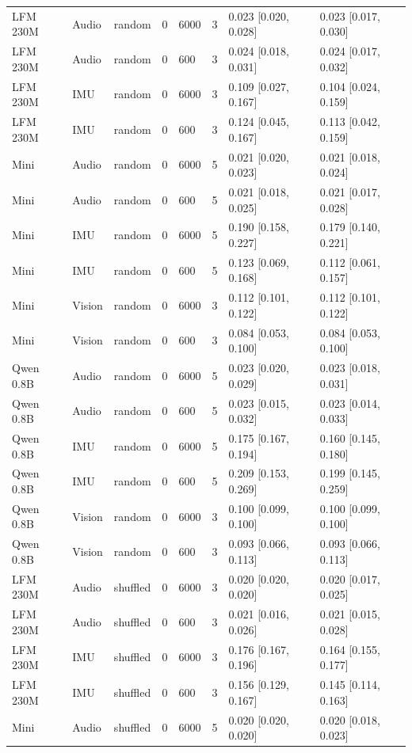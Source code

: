{\begin{longtable}{@{}llllllll@{}}
LFM 230M & Audio & random & 0 & 6000 & 3 & 0.023 [0.020, 0.028] & 0.023 [0.017, 0.030] \\
LFM 230M & Audio & random & 0 & 600 & 3 & 0.024 [0.018, 0.031] & 0.024 [0.017, 0.032] \\
LFM 230M & IMU & random & 0 & 6000 & 3 & 0.109 [0.027, 0.167] & 0.104 [0.024, 0.159] \\
LFM 230M & IMU & random & 0 & 600 & 3 & 0.124 [0.045, 0.167] & 0.113 [0.042, 0.159] \\
Mini & Audio & random & 0 & 6000 & 5 & 0.021 [0.020, 0.023] & 0.021 [0.018, 0.024] \\
Mini & Audio & random & 0 & 600 & 5 & 0.021 [0.018, 0.025] & 0.021 [0.017, 0.028] \\
Mini & IMU & random & 0 & 6000 & 5 & 0.190 [0.158, 0.227] & 0.179 [0.140, 0.221] \\
Mini & IMU & random & 0 & 600 & 5 & 0.123 [0.069, 0.168] & 0.112 [0.061, 0.157] \\
Mini & Vision & random & 0 & 6000 & 3 & 0.112 [0.101, 0.122] & 0.112 [0.101, 0.122] \\
Mini & Vision & random & 0 & 600 & 3 & 0.084 [0.053, 0.100] & 0.084 [0.053, 0.100] \\
Qwen 0.8B & Audio & random & 0 & 6000 & 5 & 0.023 [0.020, 0.029] & 0.023 [0.018, 0.031] \\
Qwen 0.8B & Audio & random & 0 & 600 & 5 & 0.023 [0.015, 0.032] & 0.023 [0.014, 0.033] \\
Qwen 0.8B & IMU & random & 0 & 6000 & 5 & 0.175 [0.167, 0.194] & 0.160 [0.145, 0.180] \\
Qwen 0.8B & IMU & random & 0 & 600 & 5 & 0.209 [0.153, 0.269] & 0.199 [0.145, 0.259] \\
Qwen 0.8B & Vision & random & 0 & 6000 & 3 & 0.100 [0.099, 0.100] & 0.100 [0.099, 0.100] \\
Qwen 0.8B & Vision & random & 0 & 600 & 3 & 0.093 [0.066, 0.113] & 0.093 [0.066, 0.113] \\
LFM 230M & Audio & shuffled & 0 & 6000 & 3 & 0.020 [0.020, 0.020] & 0.020 [0.017, 0.025] \\
LFM 230M & Audio & shuffled & 0 & 600 & 3 & 0.021 [0.016, 0.026] & 0.021 [0.015, 0.028] \\
LFM 230M & IMU & shuffled & 0 & 6000 & 3 & 0.176 [0.167, 0.196] & 0.164 [0.155, 0.177] \\
LFM 230M & IMU & shuffled & 0 & 600 & 3 & 0.156 [0.129, 0.167] & 0.145 [0.114, 0.163] \\
Mini & Audio & shuffled & 0 & 6000 & 5 & 0.020 [0.020, 0.020] & 0.020 [0.018, 0.023] \\

\end{longtable}}

